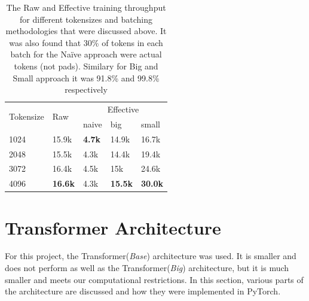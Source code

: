 \documentclass[12pt,a4paper,twoside,openright]{report}
\begin{document}
\begin{table}[]
\centering
\begin{tabular}{p{2cm}p{2cm}p{2cm}p{2cm}p{2cm}}
\toprule
\multirow{2}{*}{Tokensize} & \multirow{2}{*}{Raw} & \multicolumn{3}{c}{Effective} \\
\cmidrule(l){3-5}
                           &                      & naive    & big      & small  \\
                           \midrule \midrule
1024                       & 15.9k                & \textbf{4.7k}     & 14.9k    & 16.7k   \\
2048                       & 15.5k                & 4.3k     & 14.4k    & 19.4k   \\
3072                       & 16.4k                & 4.5k     & 15k    & 24.6k   \\
4096                       & \textbf{16.6k}                 & 4.3k     & \textbf{15.5k}    & \textbf{30.0k}  \\
\bottomrule
\end{tabular}
\caption{The Raw and Effective training throughput for different tokensizes and batching methodologies that were discussed above. It was also found that 30\% of tokens in each batch for the Na\"ive approach were actual tokens (not pads). Similary for Big and Small approach it was 91.8\% and 99.8\% respectively}
\label{table:raw-and-effective-throughpu}
\end{table}



\section{Transformer Architecture}
\label{transformer-architecture}

For this project, the Transformer(\textit{Base}) architecture was used. It is smaller and does not perform as well as the Transformer(\textit{Big}) architecture, but it is much smaller and meets our computational restrictions. In this section, various parts of the architecture are discussed and how they were implemented in PyTorch.
\end{document}
